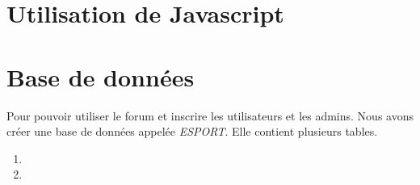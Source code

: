 \documentclass[a4paper, 11pt]{article}
\begin{document}
\section{Utilisation de Javascript}


\section{Base de données}
Pour pouvoir utiliser le forum et inscrire les utilisateurs et les admins.
Nous avons créer une base de données appelée \textit{ESPORT}.
Elle contient plusieurs tables.
\begin{enumerate}
\item %
\item %
\end{enumerate}
\end{document}
